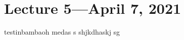 \documentclass[class=article, crop=false]{standalone}
\begin{document}
\section{Lecture 5---April 7, 2021}

testinbambaoh medas s shjkdhaskj sg
\end{document}
